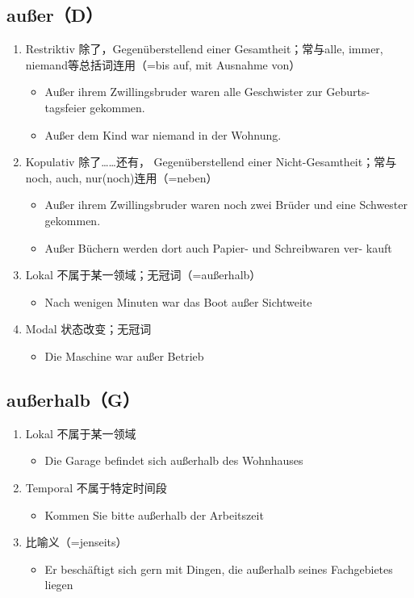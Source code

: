 \documentclass[UTF8]{report}
\begin{document}
\subsection{außer（D）}
\begin{enumerate}
    \item Restriktiv 除了，Gegenüberstellend einer Gesamtheit；常与alle, immer, niemand等总括词连用（=bis auf, mit Ausnahme von）
    \begin{itemize}
        \item Außer ihrem Zwillingsbruder waren alle Geschwister zur Geburts- tagsfeier gekommen.
        \item Außer dem Kind war niemand in der Wohnung.
    \end{itemize}
    \item Kopulativ 除了……还有， Gegenüberstellend einer Nicht-Gesamtheit；常与noch, auch, nur(noch)连用（=neben）
    \begin{itemize}
        \item Außer ihrem Zwillingsbruder waren noch zwei Brüder und eine Schwester gekommen.
        \item Außer Büchern werden dort auch Papier- und Schreibwaren ver- kauft
    \end{itemize}
    \item Lokal 不属于某一领域；无冠词（=außerhalb）
    \begin{itemize}
        \item Nach wenigen Minuten war das Boot außer Sichtweite
    \end{itemize}
    \item Modal 状态改变；无冠词
    \begin{itemize}
        \item Die Maschine war außer Betrieb
    \end{itemize}
\end{enumerate}
\subsection{außerhalb（G）}
\begin{enumerate}
    \item Lokal 不属于某一领域
    \begin{itemize}
        \item Die Garage befindet sich außerhalb des Wohnhauses
    \end{itemize}
    \item Temporal 不属于特定时间段
    \begin{itemize}
        \item Kommen Sie bitte außerhalb der Arbeitszeit
    \end{itemize}
    \item 比喻义（=jenseits）
    \begin{itemize}
        \item Er beschäftigt sich gern mit Dingen, die außerhalb seines Fachgebietes liegen
    \end{itemize}
\end{enumerate}
\end{document}
